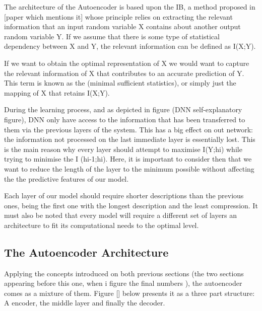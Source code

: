 \documentclass[12pt]{report}
\begin{document}
The architecture of the Autoencoder is based upon the IB, a method proposed in [paper which mentions it] whose principle relies on extracting the relevant information that an input random variable X contains about another output random variable Y. If we assume that there is some type of statistical dependency between X and Y, the relevant information can be defined as I(X;Y).\par

If we want to obtain the optimal representation of X we would want to capture the relevant information of X that contributes to an accurate prediction of Y. This term is known as the (minimal sufficient statistics), or simply just the mapping of X that retains I(X;Y).\par

During the learning process, and as depicted in figure (DNN self-explanatory figure), DNN only have access to the information that has been transferred to them via the previous layers of the system. This has a big effect on out network: the information not processed on the last immediate layer is essentially lost. This is the main reason why every layer should attempt to maximise I(Y;hi) while trying to minimise the I (hi-1;hi). Here, it is important to consider then that we want to reduce the length of the layer to the minimum possible without affecting the the predictive features of our model.

Each layer of our model should require shorter descriptions than the previous ones, being the first one with the longest description and the least compression. It must also be noted that every model will require a different set of layers an architecture to fit its computational needs to the optimal level.

\subsection{The Autoencoder Architecture}

Applying the concepts introduced on both previous sections (the two sections appearing before this one, when  i figure the final numbers ), the autoencoder comes as a mixture of them. Figure [] below presents it as a three part structure: A encoder, the middle layer and finally the decoder. \par
\end{document}
